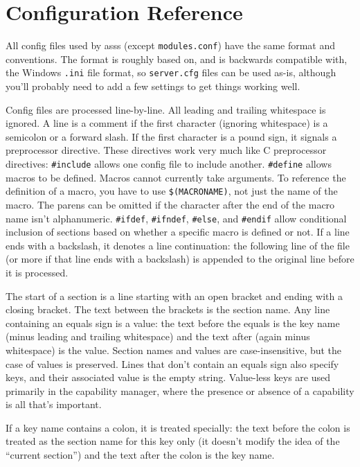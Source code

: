 \documentclass{article}
\newcommand{\asss}{asss}
\begin{document}



\section{Configuration Reference}

All config files used by \asss{} (except \verb/modules.conf/) have the
same format and conventions. The format is roughly based on, and is
backwards compatible with, the Windows \verb/.ini/ file format, so
\verb/server.cfg/ files can be used as-is, although you'll probably need
to add a few settings to get things working well.

Config files are processed line-by-line. All leading and trailing
whitespace is ignored. A line is a comment if the first character
(ignoring whitespace) is a semicolon or a forward slash. If the first
character is a pound sign, it signals a preprocessor directive. These
directives work very much like C preprocessor directives:
\verb/#include/ allows one config file to include another.
\verb/#define/ allows macros to be defined. Macros cannot currently take
arguments. To reference the definition of a macro, you have to use
\verb/$(MACRONAME)/, not just the name of the macro. The parens can be
omitted if the character after the end of the macro name isn't
alphanumeric. \verb/#ifdef/, \verb/#ifndef/, \verb/#else/, and
\verb/#endif/ allow conditional inclusion of sections based on whether a
specific macro is defined or not. If a line ends with a backslash, it
denotes a line continuation: the following line of the file (or more if
that line ends with a backslash) is appended to the original line before
it is processed.

The start of a section is a line starting with an open bracket and
ending with a closing bracket. The text between the brackets is the
section name. Any line containing an equals sign is a value: the text
before the equals is the key name (minus leading and trailing
whitespace) and the text after (again minus whitespace) is the value.
Section names and values are case-insensitive, but the case of values is
preserved. Lines that don't contain an equals sign also specify keys,
and their associated value is the empty string. Value-less keys are used
primarily in the capability manager, where the presence or absence of a
capability is all that's important.

If a key name contains a colon, it is treated specially: the text before
the colon is treated as the section name for this key only (it doesn't
modify the idea of the ``current section'') and the text after the colon
is the key name.
\end{document}
